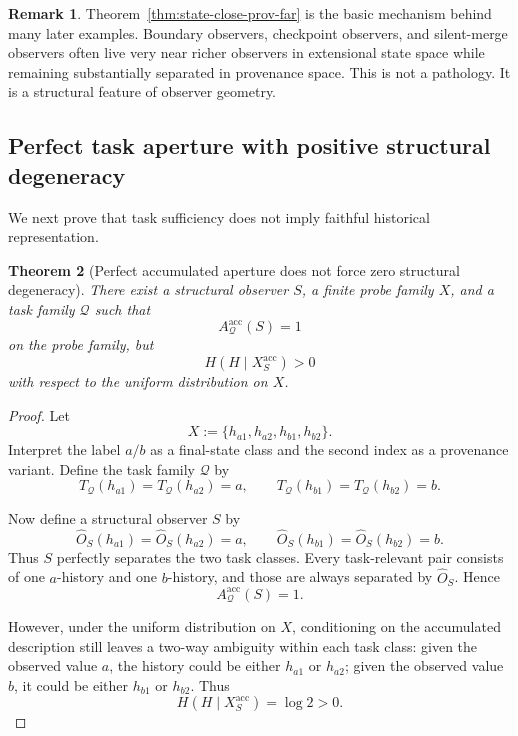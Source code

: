 \documentclass[11pt,twoside]{article}
\newtheorem{theorem}{Theorem}[section]
\theoremstyle{definition}
\newtheorem{remark}[theorem]{Remark}
\newcommand{\acc}{\mathrm{acc}}
\begin{document}
\begin{remark}
\label{rem:state-prov-separation}
Theorem~\ref{thm:state-close-prov-far} is the basic mechanism behind many later examples. Boundary observers, checkpoint observers, and silent-merge observers often live very near richer observers in extensional state space while remaining substantially separated in provenance space. This is not a pathology. It is a structural feature of observer geometry.
\end{remark}

\subsection{Perfect task aperture with positive structural degeneracy}
\label{subsec:perfect-aperture-positive-deg}

We next prove that task sufficiency does not imply faithful historical representation.

\begin{theorem}[Perfect accumulated aperture does not force zero structural degeneracy]
\label{thm:perfect-aperture-not-zero-deg}
There exist a structural observer \(S\), a finite probe family \(X\), and a task family \(\mathcal{Q}\) such that
\[
  A^{\acc}_{\mathcal{Q}}(S)=1
\]
on the probe family, but
\[
  H(H \mid X_S^{\acc}) > 0
\]
with respect to the uniform distribution on \(X\).
\end{theorem}

\begin{proof}
Let
\[
  X := \{ h_{a1}, h_{a2}, h_{b1}, h_{b2} \}.
\]
Interpret the label \(a/b\) as a final-state class and the second index as a provenance variant. Define the task family \(\mathcal{Q}\) by
\[
  T_{\mathcal{Q}}(h_{a1}) = T_{\mathcal{Q}}(h_{a2}) = a,
  \qquad
  T_{\mathcal{Q}}(h_{b1}) = T_{\mathcal{Q}}(h_{b2}) = b.
\]

Now define a structural observer \(S\) by
\[
  \widehat{O}_S(h_{a1})=\widehat{O}_S(h_{a2})=a,
  \qquad
  \widehat{O}_S(h_{b1})=\widehat{O}_S(h_{b2})=b.
\]
Thus \(S\) perfectly separates the two task classes. Every task-relevant pair consists of one \(a\)-history and one \(b\)-history, and those are always separated by \(\widehat{O}_S\). Hence
\[
  A^{\acc}_{\mathcal{Q}}(S)=1.
\]

However, under the uniform distribution on \(X\), conditioning on the accumulated description still leaves a two-way ambiguity within each task class: given the observed value \(a\), the history could be either \(h_{a1}\) or \(h_{a2}\); given the observed value \(b\), it could be either \(h_{b1}\) or \(h_{b2}\). Thus
\[
  H(H \mid X_S^{\acc}) = \log 2 > 0.
\]
\end{proof}
\end{document}
